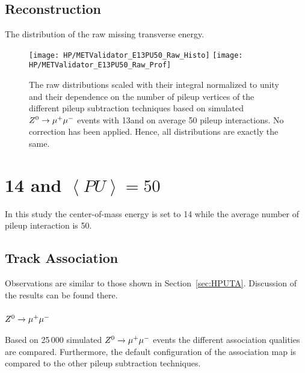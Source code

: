 \subsection{\texorpdfstring{\MET{}}{MET} Reconstruction  \label{sec:HPUAppE13PU50MC}}

The distribution of the raw missing transverse energy. 

\begin{figure}[h!t]
  \centering
  \texttt{[image: HP/METValidator\_E13PU50\_Raw\_Histo]}
  \texttt{[image: HP/METValidator\_E13PU50\_Raw\_Prof]}
  \caption[The raw \MET{} distributions and their dependence on the number of pileup vertices of different pileup subtraction techniques based on simulated  $\Zz\rightarrow\MM$ events with 13\TeV and $\left<PU\right>=50$]{The raw \MET{} distributions scaled with their integral normalized to unity and their dependence on the number of pileup vertices of the different pileup subtraction techniques based on simulated  $\Zz\rightarrow\MM$ events with 13\TeV and on average 50 pileup interactions. No correction has been applied. Hence, all distributions are exactly the same.}
\end{figure}

\section{\texorpdfstring{14\TeV{}}{14 TeV} and \texorpdfstring{$\left<PU\right>=50$}{<PU>=50}}

In this study the center-of-mass energy is set to 14\TeV{} while the average number of pileup interaction is 50.

\subsection{Track Association \label{sec:HPUAppE14PU50TA}}

Observations are similar to those shown in Section~\ref{sec:HPUTA}. Discussion of the results can be found there.

\subsubsection{$\Zz\rightarrow\MM$}

Based on 25\,000 simulated $\Zz\rightarrow\MM$ events the different association qualities are compared. Furthermore, the default configuration of the association map is compared to the other pileup subtraction techniques.

